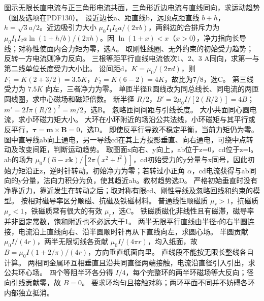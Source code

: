 \problemtext 图示无限长直电流与正三角形电流共面，三角形近边电流与直线同向，求运动趋势（图及选项在PDF130）。
\workings 设近边长a、距直线b，远顶点距直线 $b+h$，$h=\sqrt3a/2$。近边吸引力大小 $\mu_0I_1I_2 a/(2\pi b)$，两斜边的合排斥力为 $\mu_0I_1I_2 a\ln(1+h/b)/(2\pi h)$。因 $\ln(1+x)<x$（$x>0$），净力指向长导线；对称性使面内合力矩为零，选A。
\crosscheck 取刚性线圈、无外约束的初始受力趋势；反转一方电流则净力反向。
\problemtext 三根等距平行直线电流依次1、2、3 A同向，求第一与第二线单位长度受力大小比。
\workings 设间距d，$K=\mu_0/(2\pi d)$，则 $F_1=K(2+3/2)=3.5K$，$F_2=K(6-2)=4K$，故比为7/8，选C。
\crosscheck 第三线受力为 $7.5K$ 向左，三者净力为零。
\problemtext 单匝半径R圆线改为同总线长、同电流的两匝圆线圈，求中心磁场和磁矩倍数。
\workings 新半径 $R/2$，$B'=2\mu_0I/[2(R/2)]=4B$；$m'=2I\pi(R/2)^2=m/2$，选B。
\crosscheck 忽略匝间间距与引线长度。
\problemtext 大小共面同心圆电流，求小环磁力矩大小。
\workings 大环在小环附近的场沿公共法线，小环磁矩与其平行或反平行，$\bm\tau=\bm m\times\bm B=0$，选D。
\crosscheck 即使反平行导致不稳定平衡，当前力矩仍为零。
\problemtext 图中直导线ab向上通电，另一导线cd在其上方投影垂直、向右通电，可绕中点转动及改变间距，判断运动趋势。
\workings 取图面x向右、y向上，ab位于z=0，cd位于z=l。ab的场为 $\mu_0I(l\bm i-x\bm k)/[2\pi(x^2+l^2)]$，cd初始受力的y分量与x同号，因此初始力矩沿正z，逆时针转动。初始净力为零；若转过小正角 $\alpha$，cd电流获得与ab同向的y分量，法向力积分为负，使其趋近ab。教材趋势选D。
\crosscheck 严格初始垂直时没有净靠近力，靠近发生在转动之后；取对称有限cd、刚性导线及忽略回线和约束的模型。
\problemtext 按相对磁导率区分顺磁、抗磁及铁磁材料。
\workings 普通线性顺磁质 $\mu_r>1$，抗磁质 $\mu_r<1$，铁磁质常有很大的有效 $\mu_r$，选C。
\crosscheck 铁磁质磁化非线性且有磁滞，磁导率并非固定常数，饱和附近也不必远大于1。
\problemtext 两半无限平行直线由半径r的右半圆连接，电流沿上直线向右、沿半圆顺时针再从下直线向左，求圆心场。
\workings 半圆贡献 $\mu_0 I/(4r)$，两半无限切线各贡献 $\mu_0I/(4\pi r)$，均入纸面，故 $B=\mu_0I(1+2/\pi)/(4r)$，方向垂直纸面向里。
\crosscheck 直线段不能按无限长整线各自计算。
\problemtext 两相同金属环互相垂直且沿共同直径两端接触，电流沿直径引入引出，求公共环心场。
\workings 四个等阻半环各分得 $I/4$，每个完整环的两半环磁场等大反向；径向引线贡献零，故 $B=0$。
\crosscheck 要求环均匀且接触对称；两环平面不同并不妨碍各环内部独立抵消。
